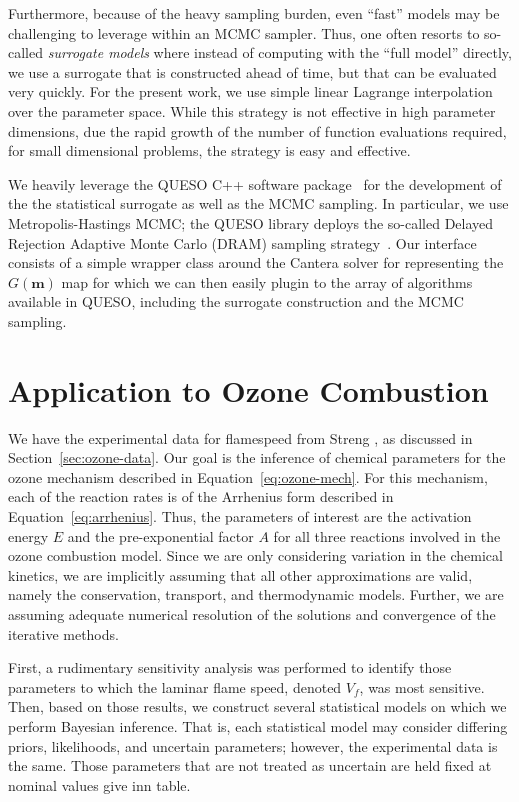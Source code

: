  Furthermore, because of the heavy sampling burden, even ``fast''
 models may be challenging to leverage within an MCMC sampler. Thus,
 one often resorts to so-called \emph{surrogate models} where instead of
 computing with the ``full model'' directly, we use a surrogate that
 is constructed ahead of time, but that can be evaluated very
 quickly. For the present work, we use simple linear Lagrange
 interpolation over the parameter space. While this strategy is not
 effective in high parameter dimensions, due the rapid growth of the
 number of function evaluations required, for small dimensional
 problems, the strategy is easy and effective.

 We heavily leverage the QUESO C++ software package~\cite{QUESO} for the
 development of the the statistical surrogate as well as the MCMC
 sampling. In particular, we use Metropolis-Hastings MCMC; the QUESO
 library deploys the so-called Delayed Rejection Adaptive Monte Carlo
 (DRAM) sampling strategy~\cite{DRAM}. Our interface consists of a
 simple wrapper class around the Cantera solver for representing the
 $G(\mathbf{m})$ map for which we can then easily plugin to the array
 of algorithms available in QUESO, including the surrogate
 construction and the MCMC sampling.

\section{Application to Ozone Combustion}

 We have the experimental data for flamespeed from Streng
 \cite{Streng}, as discussed in Section~\ref{sec:ozone-data}.
 Our goal is the inference of
 chemical parameters for the ozone mechanism described in
 Equation~\eqref{eq:ozone-mech}. For this mechanism, each of the
 reaction rates is of the Arrhenius form described in
 Equation~\eqref{eq:arrhenius}.
 Thus, the parameters of interest are the
 activation energy $E$ and the
 pre-exponential factor $A$ for all three reactions involved in the
 ozone combustion model. Since we are only considering variation in
 the chemical kinetics, we are implicitly assuming that all other
 approximations are valid, namely the conservation, transport, and
 thermodynamic models. Further, we are assuming adequate numerical
 resolution of the solutions and convergence of the iterative methods.

 First, a rudimentary sensitivity analysis was performed to identify
 those parameters to which the laminar flame speed, denoted $V_f$, was most
 sensitive. Then, based on those results, we construct several
 statistical models on which we perform Bayesian inference. That is,
 each statistical model may consider differing priors, likelihoods,
 and uncertain parameters; however, the experimental data is the
 same. Those parameters that are not treated as uncertain are held
 fixed at nominal values give inn table.

